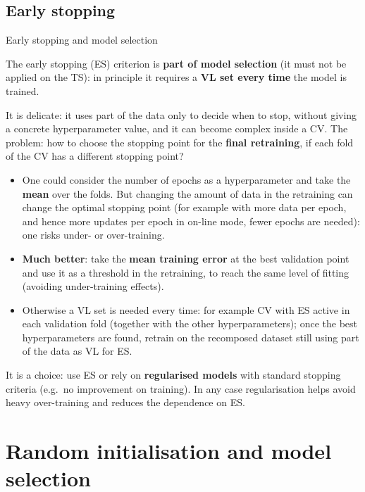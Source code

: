 \subsection{Early stopping}\label{early-stopping}

\begin{boxwarning}{Early stopping and model selection}

The early stopping (ES) criterion is \textbf{part of model selection}
(it must not be applied on the TS): in principle it requires a
\textbf{VL set every time} the model is trained.

\end{boxwarning}

It is delicate: it uses part of the data only to decide when to stop,
without giving a concrete hyperparameter value, and it can become
complex inside a CV. The problem: how to choose the stopping point for
the \textbf{final retraining}, if each fold of the CV has a different
stopping point?

\begin{itemize}
\tightlist
\item
  One could consider the number of epochs as a hyperparameter and take
  the \textbf{mean} over the folds. But changing the amount of data in
  the retraining can change the optimal stopping point (for example
  with more data per epoch, and hence more updates per epoch in
  on-line mode, fewer epochs are needed): one risks under- or
  over-training.
\item
  \textbf{Much better}: take the \textbf{mean training error} at the
  best validation point and use it as a threshold in the retraining,
  to reach the same level of fitting (avoiding under-training effects).
\item
  Otherwise a VL set is needed every time: for example CV with ES
  active in each validation fold (together with the other
  hyperparameters); once the best hyperparameters are found, retrain on
  the recomposed dataset still using part of the data as VL for ES.
\end{itemize}

It is a choice: use ES or rely on \textbf{regularised models} with
standard stopping criteria (e.g.\ no improvement on training). In any
case regularisation helps avoid heavy over-training and reduces the
dependence on ES.

\section{Random initialisation and model
selection}\label{inizializzazione-casuale-e-model-selection}

